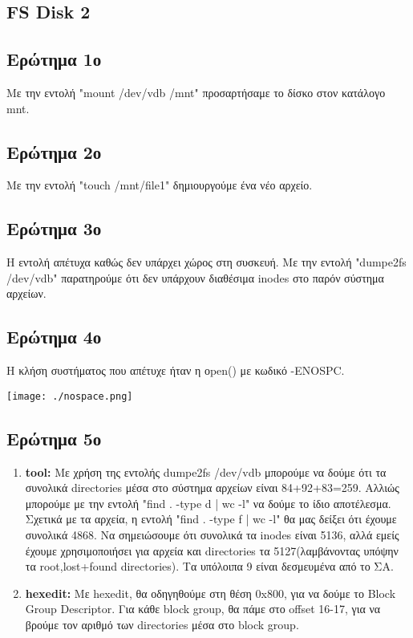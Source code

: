 \documentclass{article}
\begin{document}
\begin{enumerate}
\pagebreak

\section{FS Disk 2}
\subsection{Ερώτημα 1ο}
Με την εντολή "mount /dev/vdb /mnt" προσαρτήσαμε το δίσκο στον κατάλογο mnt.\\

\subsection{Ερώτημα 2ο}
Με την εντολή "touch /mnt/file1" δημιουργούμε ένα νέο αρχείο.\\

\subsection{Ερώτημα 3ο}
Η εντολή απέτυχα καθώς δεν υπάρχει χώρος στη συσκευή. Με την εντολή "dumpe2fs /dev/vdb" παρατηρούμε 
ότι δεν υπάρχουν διαθέσιμα inodes στο παρόν σύστημα αρχείων.\\

\subsection{Ερώτημα 4ο}
Η κλήση συστήματος που απέτυχε ήταν η οpen() με κωδικό -ENOSPC.\\
\begin{center}
    \texttt{[image: ./nospace.png]}
\end{center}

\subsection{Ερώτημα 5ο}
\begin{enumerate}
    \item{\textbf{tool: }Με χρήση της εντολής dumpe2fs /dev/vdb μπορούμε να δούμε ότι τα συνολικά directories μέσα στο 
        σύστημα αρχείων είναι 84+92+83=259. Αλλιώς μπορούμε με την εντολή "find . -type d | wc -l" να 
        δούμε το ίδιο αποτέλεσμα. Σχετικά με τα αρχεία, η εντολή "find . -type f | wc -l" θα μας δείξει
        ότι έχουμε συνολικά 4868. Να σημειώσουμε ότι συνολικά τα inodes είναι 5136, αλλά εμείς έχουμε 
        χρησιμοποιήσει για αρχεία και directories τα 5127(λαμβάνοντας υπόψην τα root,lost+found directories).
        Τα υπόλοιπα 9 είναι δεσμευμένα από το ΣΑ.\\}
    \item{\textbf{hexedit: }Με hexedit, θα οδηγηθούμε στη θέση 0x800, για να δούμε το Block Group Descriptor. Για κάθε 
        block group, θα πάμε στο offset 16-17, για να βρούμε τον αριθμό των directories μέσα στο block
        group. 

}
\end{enumerate}
\end{enumerate}
\end{document}
